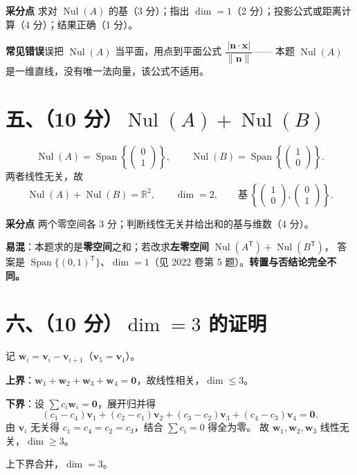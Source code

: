 \documentclass[11pt]{ctexart}
\newcommand{\Rr}{\mathbb{R}}
\newcommand{\Nul}{\operatorname{Nul}}
\newcommand{\Span}{\operatorname{Span}}
\newcommand{\TT}{^{\mathsf T}}
\newcommand{\bv}[1]{\begin{pmatrix}#1\end{pmatrix}}
\begin{document}
\begin{scorebox}
\textbf{采分点}\quad
求对 $\Nul(A)$ 的基（3 分）；指出 $\dim=1$（2 分）；投影公式或距离计算（4 分）；结果正确（1 分）。

\textbf{常见错误}\quad 误把 $\Nul(A)$ 当平面，用点到平面公式 $\dfrac{|\mathbf n\cdot\mathbf x|}{\|\mathbf n\|}$——
本题 $\Nul(A)$ 是一维直线，没有唯一法向量，该公式不适用。
\end{scorebox}

\section*{五、（10 分）$\Nul(A)+\Nul(B)$}

\begin{ansbox}
\[
\Nul(A)=\Span\left\{\bv{0\\1}\right\},\qquad
\Nul(B)=\Span\left\{\bv{1\\0}\right\}.
\]
两者线性无关，故
\[
\Nul(A)+\Nul(B)=\Rr^2,\qquad \dim=2,\qquad\text{基}\ \left\{\bv{1\\0},\bv{0\\1}\right\}.
\]
\end{ansbox}

\begin{scorebox}
\textbf{采分点}\quad
两个零空间各 3 分；判断线性无关并给出和的基与维数（4 分）。

\textbf{易混}：本题求的是\textbf{零空间}之和；若改求\textbf{左零空间} $\Nul(A\TT)+\Nul(B\TT)$，
答案是 $\Span\{(0,1)\TT\}$、$\dim=1$（见 2022 卷第 5 题）。\textbf{转置与否结论完全不同。}
\end{scorebox}

\section*{六、（10 分）$\dim=3$ 的证明}

\begin{ansbox}
记 $\mathbf w_i=\mathbf v_i-\mathbf v_{i+1}$（$\mathbf v_5=\mathbf v_1$）。

\textbf{上界}：$\mathbf w_1+\mathbf w_2+\mathbf w_3+\mathbf w_4=\mathbf 0$，故线性相关，$\dim\le3$。

\textbf{下界}：设 $\sum c_i\mathbf w_i=\mathbf 0$，展开归并得
\[
(c_1-c_4)\mathbf v_1+(c_2-c_1)\mathbf v_2+(c_3-c_2)\mathbf v_3+(c_4-c_3)\mathbf v_4=\mathbf 0 .
\]
由 $\mathbf v_i$ 无关得 $c_1=c_4=c_2=c_3$，结合 $\sum c_i=0$ 得全为零。
故 $\mathbf w_1,\mathbf w_2,\mathbf w_3$ 线性无关，$\dim\ge3$。

上下界合并，$\dim=3$。
\end{ansbox}
\end{document}
